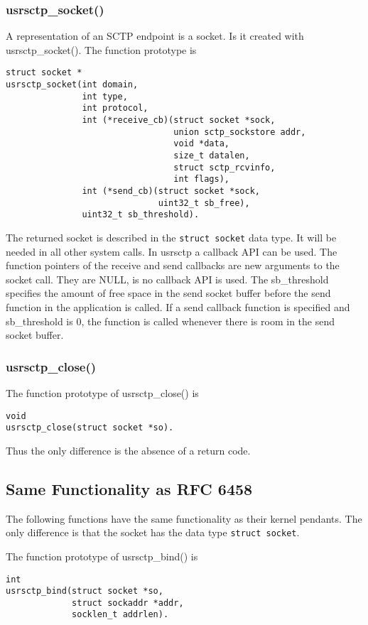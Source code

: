 \documentclass[a4paper]{article}
\begin{document}
\subsubsection{usrsctp\_socket()}
A representation of an SCTP endpoint is a socket. Is it created with usrsctp\_socket().
The function prototype is 
\begin{verbatim}
struct socket *
usrsctp_socket(int domain, 
               int type, 
               int protocol,
               int (*receive_cb)(struct socket *sock, 
                                 union sctp_sockstore addr, 
                                 void *data,
                                 size_t datalen, 
                                 struct sctp_rcvinfo, 
                                 int flags),
               int (*send_cb)(struct socket *sock, 
                              uint32_t sb_free),
               uint32_t sb_threshold).
\end{verbatim}
The returned socket is described in the \texttt{struct socket} data type. It will be needed in all
other system calls.
In usrsctp a callback API can be used. The function pointers of the receive and send callbacks
are new arguments to the socket call. They are NULL, is no callback API is used. The sb\_threshold 
specifies the amount of free space in the send socket buffer before the send function in the 
application is called. If a send callback function is specified and sb\_threshold is 0, the function is
called whenever there is room in the send socket buffer.

\subsubsection{usrsctp\_close()}

The function prototype of usrsctp\_close() is 
\begin{verbatim}   
void
usrsctp_close(struct socket *so).
 \end{verbatim}
Thus the only difference is the absence of a return code. 
 
\subsection{Same Functionality as RFC 6458}
The following functions have the same functionality as their kernel pendants. The only difference is
that the socket has the data type \texttt{struct socket}.

The function prototype of usrsctp\_bind() is 
\begin{verbatim}
int
usrsctp_bind(struct socket *so,
             struct sockaddr *addr,
             socklen_t addrlen).
\end{verbatim}      
\end{document}
